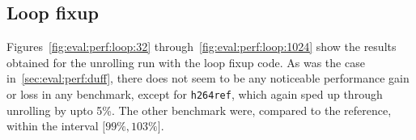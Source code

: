 \subsection{Loop fixup}\label{sec:eval:perf:loop}



Figures~\ref{fig:eval:perf:loop:32} through~\ref{fig:eval:perf:loop:1024} show the results obtained for the unrolling run with the loop fixup code.
As was the case in~\cref{sec:eval:perf:duff}, there does not seem to be any noticeable performance gain or loss in any benchmark, except for \texttt{h264ref}, which again sped up through unrolling by upto 5\%.
The other benchmark were, compared to the reference, within the interval $\lbrack 99\%, 103\% \rbrack$.
